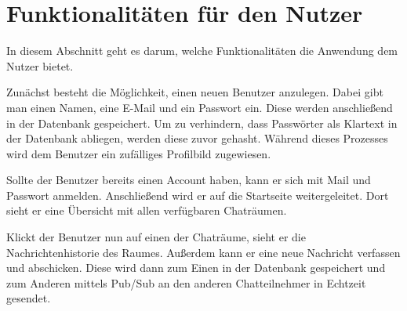 
\section{Funktionalitäten für den Nutzer}

In diesem Abschnitt geht es darum, welche Funktionalitäten die Anwendung dem Nutzer bietet.

Zunächst besteht die Möglichkeit, einen neuen Benutzer anzulegen. Dabei gibt man einen Namen, eine E-Mail und ein Passwort ein.
Diese werden anschließend in der Datenbank gespeichert. Um zu verhindern, dass Passwörter als Klartext in der Datenbank abliegen, werden diese zuvor gehasht.
Während dieses Prozesses wird dem Benutzer ein zufälliges Profilbild zugewiesen.

Sollte der Benutzer bereits einen Account haben, kann er sich mit Mail und Passwort anmelden.
Anschließend wird er auf die Startseite weitergeleitet. Dort sieht er eine Übersicht mit allen verfügbaren Chaträumen.

Klickt der Benutzer nun auf einen der Chaträume, sieht er die Nachrichtenhistorie des Raumes. Außerdem kann er eine neue Nachricht verfassen und abschicken.
Diese wird dann zum Einen in der Datenbank gespeichert und zum Anderen mittels \acs{Pub/Sub} an den anderen Chatteilnehmer in Echtzeit gesendet.
